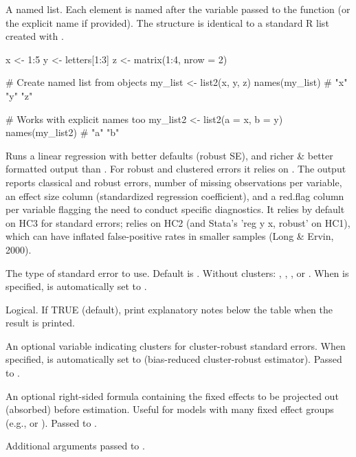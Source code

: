 \documentclass[a4paper]{book}
\begin{document}
%
\begin{Value}
A named list. Each element is named after the variable passed to 
the function (or the explicit name if provided). The structure is identical 
to a standard R list created with .
\end{Value}
%
\begin{Examples}
\begin{ExampleCode}
x <- 1:5
y <- letters[1:3]
z <- matrix(1:4, nrow = 2)

# Create named list from objects
my_list <- list2(x, y, z)
names(my_list)  # "x" "y" "z"

# Works with explicit names too
my_list2 <- list2(a = x, b = y)
names(my_list2)  # "a" "b"

\end{ExampleCode}
\end{Examples}
%
\begin{Description}
Runs a linear regression with better defaults (robust SE), and richer \& better 
formatted output than . For robust and clustered errors it relies on . 
The output reports classical and robust errors, number of missing observations per
variable, an effect size column (standardized regression coefficient), and a red.flag column per variable 
flagging the need to conduct specific diagnostics. It relies by default on HC3 for standard errors;
 relies on HC2 (and Stata's 'reg y x, robust' on HC1), which can have
inflated false-positive rates in smaller samples (Long \& Ervin, 2000).
\end{Description}
%
\begin{Arguments}
\begin{ldescription}
\item[\code{se\_type}] The type of standard error to use. Default is .
Without clusters: , , , or .
When  is specified,  is automatically set to .

\item[\code{notes}] Logical. If TRUE (default), print explanatory notes below the table
when the result is printed.

\item[\code{clusters}] An optional variable indicating clusters for cluster-robust standard 
errors. When specified,  is automatically set to  
(bias-reduced cluster-robust estimator). Passed to .

\item[\code{fixed\_effects}] An optional right-sided formula containing the fixed effects 
to be projected out (absorbed) before estimation. Useful for models with many 
fixed effect groups (e.g.,  or ). 
Passed to .

\item[\code{...}] Additional arguments passed to .
\end{ldescription}
\end{Arguments}
\end{document}
